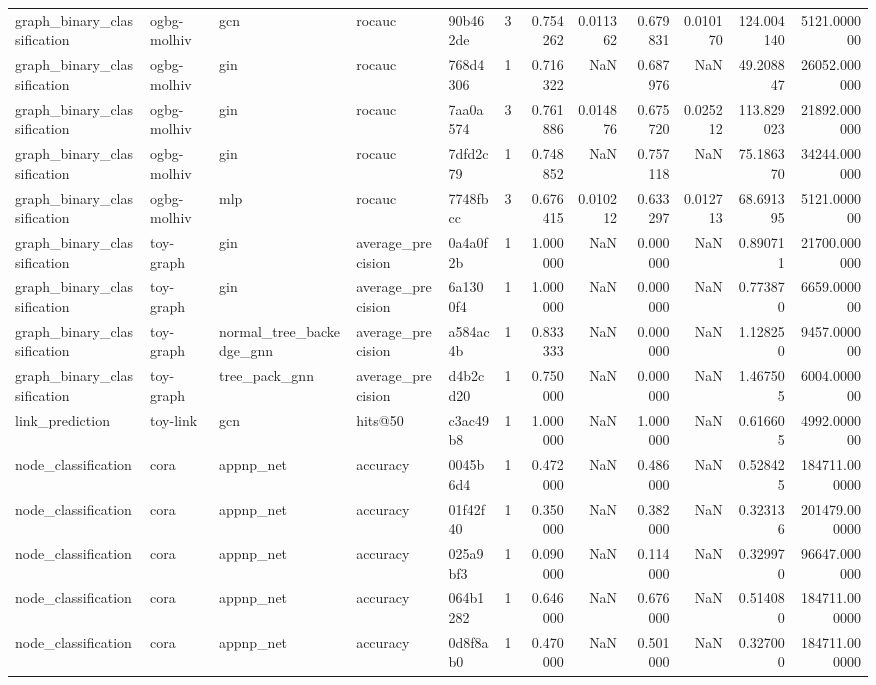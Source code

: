 \begin{tabular}{lllllrrrrrrr}
graph_binary_classification & ogbg-molhiv & gcn & rocauc & 90b462de & 3 & 0.754262 & 0.011362 & 0.679831 & 0.010170 & 124.004140 & 5121.000000 \\
graph_binary_classification & ogbg-molhiv & gin & rocauc & 768d4306 & 1 & 0.716322 & NaN & 0.687976 & NaN & 49.208847 & 26052.000000 \\
graph_binary_classification & ogbg-molhiv & gin & rocauc & 7aa0a574 & 3 & 0.761886 & 0.014876 & 0.675720 & 0.025212 & 113.829023 & 21892.000000 \\
graph_binary_classification & ogbg-molhiv & gin & rocauc & 7dfd2c79 & 1 & 0.748852 & NaN & 0.757118 & NaN & 75.186370 & 34244.000000 \\
graph_binary_classification & ogbg-molhiv & mlp & rocauc & 7748fbcc & 3 & 0.676415 & 0.010212 & 0.633297 & 0.012713 & 68.691395 & 5121.000000 \\
graph_binary_classification & toy-graph & gin & average_precision & 0a4a0f2b & 1 & 1.000000 & NaN & 0.000000 & NaN & 0.890711 & 21700.000000 \\
graph_binary_classification & toy-graph & gin & average_precision & 6a1300f4 & 1 & 1.000000 & NaN & 0.000000 & NaN & 0.773870 & 6659.000000 \\
graph_binary_classification & toy-graph & normal_tree_backedge_gnn & average_precision & a584ac4b & 1 & 0.833333 & NaN & 0.000000 & NaN & 1.128250 & 9457.000000 \\
graph_binary_classification & toy-graph & tree_pack_gnn & average_precision & d4b2cd20 & 1 & 0.750000 & NaN & 0.000000 & NaN & 1.467505 & 6004.000000 \\
link_prediction & toy-link & gcn & hits@50 & c3ac49b8 & 1 & 1.000000 & NaN & 1.000000 & NaN & 0.616605 & 4992.000000 \\
node_classification & cora & appnp_net & accuracy & 0045b6d4 & 1 & 0.472000 & NaN & 0.486000 & NaN & 0.528425 & 184711.000000 \\
node_classification & cora & appnp_net & accuracy & 01f42f40 & 1 & 0.350000 & NaN & 0.382000 & NaN & 0.323136 & 201479.000000 \\
node_classification & cora & appnp_net & accuracy & 025a9bf3 & 1 & 0.090000 & NaN & 0.114000 & NaN & 0.329970 & 96647.000000 \\
node_classification & cora & appnp_net & accuracy & 064b1282 & 1 & 0.646000 & NaN & 0.676000 & NaN & 0.514080 & 184711.000000 \\
node_classification & cora & appnp_net & accuracy & 0d8f8ab0 & 1 & 0.470000 & NaN & 0.501000 & NaN & 0.327000 & 184711.000000 \\

\end{tabular}
